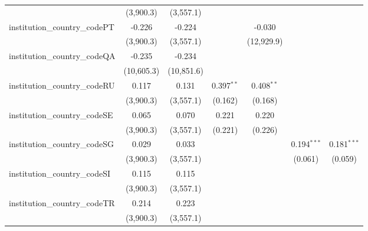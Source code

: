 \begin{tabular}{lcccccc}
                                         & (3,900.3)      & (3,557.1)      &               &               &                &   \\   
   institution\_country\_codePT          & -0.226         & -0.224         &               & -0.030        &                &   \\   
                                         & (3,900.3)      & (3,557.1)      &               & (12,929.9)    &                &   \\   
   institution\_country\_codeQA          & -0.235         & -0.234         &               &               &                &   \\   
                                         & (10,605.3)     & (10,851.6)     &               &               &                &   \\   
   institution\_country\_codeRU          & 0.117          & 0.131          & 0.397$^{**}$  & 0.408$^{**}$  &                &   \\   
                                         & (3,900.3)      & (3,557.1)      & (0.162)       & (0.168)       &                &   \\   
   institution\_country\_codeSE          & 0.065          & 0.070          & 0.221         & 0.220         &                &   \\   
                                         & (3,900.3)      & (3,557.1)      & (0.221)       & (0.226)       &                &   \\   
   institution\_country\_codeSG          & 0.029          & 0.033          &               &               & 0.194$^{***}$  & 0.181$^{***}$\\   
                                         & (3,900.3)      & (3,557.1)      &               &               & (0.061)        & (0.059)\\   
   institution\_country\_codeSI          & 0.115          & 0.115          &               &               &                &   \\   
                                         & (3,900.3)      & (3,557.1)      &               &               &                &   \\   
   institution\_country\_codeTR          & 0.214          & 0.223          &               &               &                &   \\   
                                         & (3,900.3)      & (3,557.1)      &               &               &                &   \\   

\end{tabular}
